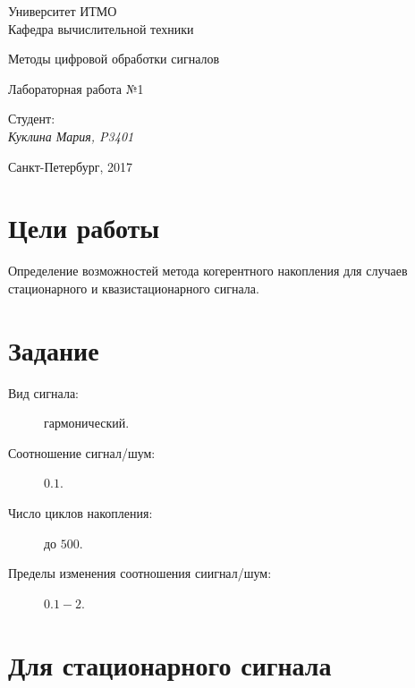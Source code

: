 \documentclass[12pt, a4paper] {ncc}
\begin{document}
\setcounter{figure}{0}
\frenchspacing
\pagestyle{empty}
\begin{center}
							Университет ИТМО	\\
                        Кафедра вычислительной техники

                    Методы цифровой обработки сигналов
\end{center}
\begin{center}
                            Лабораторная работа №1\\
\end{center}
\begin{flushright}
                                    Студент:\\
                                    {\it Куклина Мария, P3401}
\end{flushright}
\begin{center}
                             Санкт-Петербург, 2017
\end{center}
\newpage


\section{Цели работы}
Определение возможностей метода когерентного накопления для случаев стационарного
и квазистационарного сигнала.
\section{Задание}

    \begin{description}
        \item[Вид сигнала:] гармонический. 
        \item[Соотношение сигнал/шум:] $0.1$.
        \item[Число циклов накопления:] до $500$.
        \item[Пределы изменения соотношения сиигнал/шум:] $0.1-2$.
    \end{description}

\section{Для стационарного сигнала}
    
\end{document}
